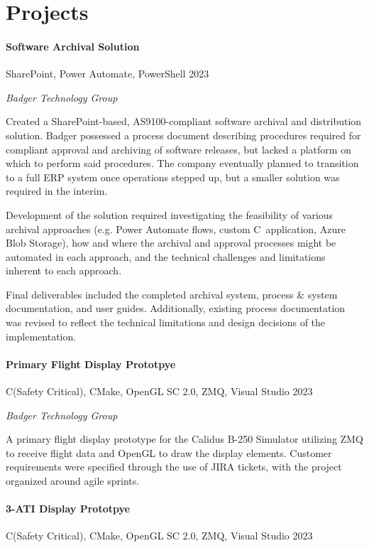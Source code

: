 \documentclass[10pt]{article}
\newcommand{\Rplus}{\protect\raisebox{0.35ex}{\smaller{\smaller{\textbf{+}}}}}
\newcommand{\Rsharp}{\protect\raisebox{0.35ex}{\smaller{\smaller{\textbf{\#}}}}}
\newcommand{\Cpp}{\mbox{C\Rplus\Rplus}}
\newcommand{\Csharp}{\mbox{C\Rsharp}}
\newcommand{\firstpar}{\vspace{4pt}\noindent}
\begin{document}
\section*{Projects}
\paragraph{Software Archival Solution}
\vline\quad SharePoint, Power Automate, PowerShell \hfill 2023

\noindent
\textit{Badger Technology Group}

\firstpar
Created a SharePoint-based, AS9100-compliant software archival and distribution solution.
Badger possessed a process document describing procedures required for compliant approval
and archiving of software releases, but lacked a platform on which to perform said procedures.
The company eventually planned to transition to a full ERP system once operations
stepped up, but a smaller solution was required in the interim.

Development of the solution required investigating the feasibility of various archival
approaches (e.g. Power Automate flows, custom \Csharp\ application, Azure Blob Storage),
how and where the archival and approval processes might be automated in each approach,
and the technical challenges and limitations inherent to each approach.

Final deliverables included the completed archival system, process \& system documentation,
and user guides. Additionally, existing process documentation was revised to reflect the
technical limitations and design decisions of the implementation.

\paragraph{Primary Flight Display Prototpye}
\vline\quad \Cpp (Safety Critical), CMake, OpenGL SC 2.0, ZMQ, Visual Studio \hfill 2023

\noindent
\textit{Badger Technology Group}

\firstpar
A primary flight display prototype for the Calidus B-250 Simulator utilizing ZMQ to receive flight
data and OpenGL to draw the display elements. Customer requirements were specified through the use
of JIRA tickets, with the project organized around agile sprints.

\paragraph{3-ATI Display Prototpye}
\vline\quad \Cpp (Safety Critical), CMake, OpenGL SC 2.0, ZMQ, Visual Studio \hfill 2023
\end{document}
